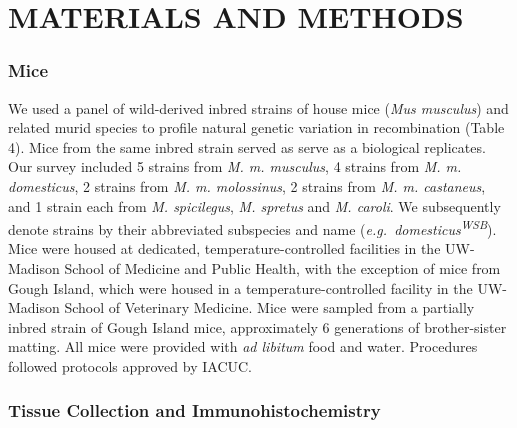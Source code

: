 \documentclass[
]{article}
\begin{document}
\hypertarget{materials-and-methods}{%
\section{MATERIALS AND METHODS}\label{materials-and-methods}}

\hypertarget{mice}{%
\subsubsection{Mice}\label{mice}}

We used a panel of wild-derived inbred strains of house mice (\emph{Mus
musculus}) and related murid species to profile natural genetic
variation in recombination (Table 4). Mice from the same inbred strain
served as serve as a biological replicates. Our survey included 5
strains from \emph{M. m. musculus}, 4 strains from \emph{M. m.
domesticus}, 2 strains from \emph{M. m. molossinus}, 2 strains from
\emph{M. m. castaneus}, and 1 strain each from \emph{M. spicilegus},
\emph{M. spretus} and \emph{M. caroli}. We subsequently denote strains
by their abbreviated subspecies and name
(\emph{e.g.~domesticus\textsuperscript{WSB}}). Mice were housed at
dedicated, temperature-controlled facilities in the UW-Madison School of
Medicine and Public Health, with the exception of mice from Gough
Island, which were housed in a temperature-controlled facility in the
UW-Madison School of Veterinary Medicine. Mice were sampled from a
partially inbred strain of Gough Island mice, approximately 6
generations of brother-sister matting. All mice were provided with
\emph{ad libitum} food and water. Procedures followed protocols approved
by IACUC.

\hypertarget{tissue-collection-and-immunohistochemistry}{%
\subsubsection{Tissue Collection and
Immunohistochemistry}\label{tissue-collection-and-immunohistochemistry}}
\end{document}
